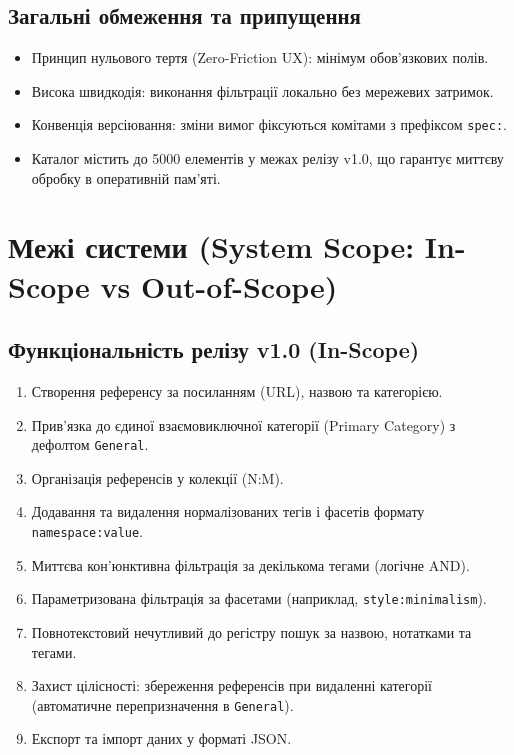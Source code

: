 \documentclass[12pt,a4paper]{article}
\begin{document}
\subsection{Загальні обмеження та припущення}
\begin{itemize}[noitemsep]
    \item Принцип нульового тертя (Zero-Friction UX): мінімум обов'язкових полів.
    \item Висока швидкодія: виконання фільтрації локально без мережевих затримок.
    \item Конвенція версіювання: зміни вимог фіксуються комітами з префіксом \texttt{spec:}.
    \item Каталог містить до 5000 елементів у межах релізу v1.0, що гарантує миттєву обробку в оперативній пам'яті.
\end{itemize}

\section{Межі системи (System Scope: In-Scope vs Out-of-Scope)}

\subsection{Функціональність релізу v1.0 (In-Scope)}
\begin{enumerate}[noitemsep]
    \item Створення референсу за посиланням (URL), назвою та категорією.
    \item Прив'язка до єдиної взаємовиключної категорії (Primary Category) з дефолтом \texttt{General}.
    \item Організація референсів у колекції (N:M).
    \item Додавання та видалення нормалізованих тегів і фасетів формату \texttt{namespace:value}.
    \item Миттєва кон'юнктивна фільтрація за декількома тегами (логічне AND).
    \item Параметризована фільтрація за фасетами (наприклад, \texttt{style:minimalism}).
    \item Повнотекстовий нечутливий до регістру пошук за назвою, нотатками та тегами.
    \item Захист цілісності: збереження референсів при видаленні категорії (автоматичне перепризначення в \texttt{General}).
    \item Експорт та імпорт даних у форматі JSON.
\end{enumerate}
\end{document}
